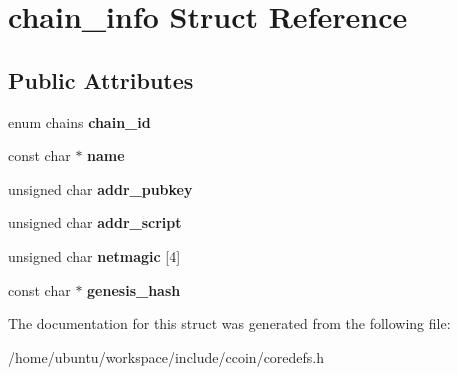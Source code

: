 \hypertarget{structchain__info}{\section{chain\-\_\-info Struct Reference}
\label{structchain__info}
}
\subsection*{Public Attributes}
\begin{DoxyCompactItemize}
\item 
\hypertarget{structchain__info_a93f517692bdd0076463bb10117217f76}{enum chains {\bfseries chain\-\_\-id}}\label{structchain__info_a93f517692bdd0076463bb10117217f76}

\item 
\hypertarget{structchain__info_aa5b3aef81bdad959cc4a477d9efc3c53}{const char $\ast$ {\bfseries name}}\label{structchain__info_aa5b3aef81bdad959cc4a477d9efc3c53}

\item 
\hypertarget{structchain__info_aa39ca2a9ed52c57da0fb9103afaa9ce8}{unsigned char {\bfseries addr\-\_\-pubkey}}\label{structchain__info_aa39ca2a9ed52c57da0fb9103afaa9ce8}

\item 
\hypertarget{structchain__info_ab3cf7d8d6f8681bc9dcf4e2345c68075}{unsigned char {\bfseries addr\-\_\-script}}\label{structchain__info_ab3cf7d8d6f8681bc9dcf4e2345c68075}

\item 
\hypertarget{structchain__info_a781b2c6c0b4cd2a978d78850964521e4}{unsigned char {\bfseries netmagic} \mbox{[}4\mbox{]}}\label{structchain__info_a781b2c6c0b4cd2a978d78850964521e4}

\item 
\hypertarget{structchain__info_ad5c4780d2f7c6741ea5c1aa34dd557b1}{const char $\ast$ {\bfseries genesis\-\_\-hash}}\label{structchain__info_ad5c4780d2f7c6741ea5c1aa34dd557b1}

\end{DoxyCompactItemize}


The documentation for this struct was generated from the following file\-:\begin{DoxyCompactItemize}
\item 
/home/ubuntu/workspace/include/ccoin/coredefs.\-h\end{DoxyCompactItemize}
